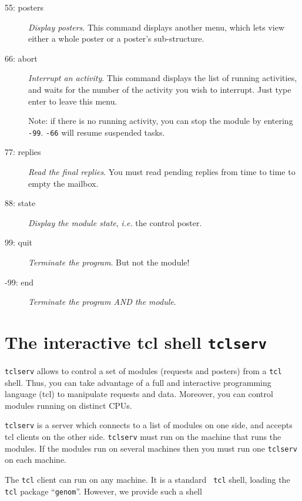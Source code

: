 \begin{description}
\item[55: posters] {\em Display posters}. This command displays another
menu, which lets view either a whole poster or a poster's sub-structure.

\item[66: abort] {\em Interrupt an activity}. This command displays the
list of running activities, and waits for the number of the activity you
wish to interrupt. Just type enter to leave this menu.

Note: if there is no running activity, you can stop the module by
entering {\tt -99}. {\tt -66} will resume suspended tasks.

\item[77: replies] {\em Read the final replies}. You must read pending
replies from time to time to empty the mailbox.

\item[88: state] {\em Display the module state}, {\em i.e.} the control
poster.

\item[99: quit] {\em Terminate the program}. But not the module!

\item[-99: end] {\em Terminate the program AND the module}.
\end{description}


\section{The interactive tcl shell {\tt tclserv}}
\label{sec|tcl}

{\tt tclserv} allows to control a set of modules (requests and posters)
from a {\tt tcl} shell. Thus, you can take advantage of a full and
interactive programming language (tcl) to manipulate requests and data.
Moreover, you can control modules running on distinct CPUs.


{\tt tclserv} is a server which  connects to  a  list of modules on  one
side, and accepts  tcl clients on  the other side. {\tt tclserv} must run
on the machine that runs the modules. If the modules run on several machines
then you must run one {\tt tclserv} on each machine. 

The {\tt tcl} client can run on any machine. It is a standard {\tt
tcl} shell, loading the {\tt tcl} package ``{\tt genom}''. However, we
provide such a shell 


